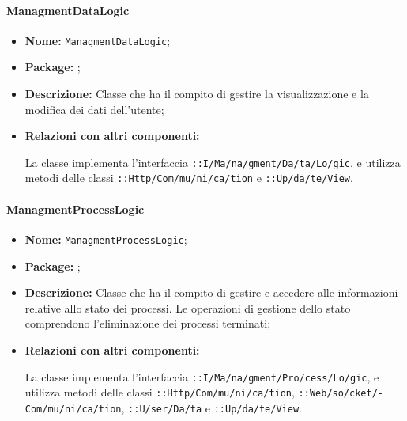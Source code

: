 \paragraph{ManagmentDataLogic}
\begin{flushleft}
\begin{itemize}
\item \textbf{Nome:} \texttt{ManagmentDataLogic};
\item \textbf{Package:} \texttt{\logicUser{}};
\item \textbf{Descrizione:} Classe che ha il compito di gestire la visualizzazione e la modifica dei dati dell'utente;
\item \textbf{Relazioni con altri componenti:}
\begin{sloppypar}
La classe implementa l'interfaccia \texttt{\iLogicUser{}::I\fshyp{}Ma\fshyp{}na\fshyp{}gment\fshyp{}Da\fshyp{}ta\fshyp{}Lo\fshyp{}gic}, e utilizza metodi delle classi \texttt{\serverCommunication{}::Http\fshyp{}Com\fshyp{}mu\fshyp{}ni\fshyp{}ca\fshyp{}tion} e \texttt{\viewUser{}::Up\fshyp{}da\fshyp{}te\fshyp{}View}.
\end{sloppypar}
\end{itemize}
\end{flushleft}

\paragraph{ManagmentProcessLogic}
\begin{flushleft}
\begin{itemize}
\item \textbf{Nome:} \texttt{ManagmentProcessLogic};
\item \textbf{Package:} \texttt{\logicUser{}};
\item \textbf{Descrizione:} Classe che ha il compito di gestire e accedere alle informazioni relative allo stato dei processi. Le operazioni di gestione dello stato comprendono l'eliminazione dei processi terminati;
\item \textbf{Relazioni con altri componenti:}
\begin{sloppypar}
La classe implementa l'interfaccia \texttt{\iLogicUser{}::I\fshyp{}Ma\fshyp{}na\fshyp{}gment\fshyp{}Pro\fshyp{}cess\fshyp{}Lo\fshyp{}gic}, e utilizza metodi delle classi 
\texttt{\serverCommunication{}::Http\fshyp{}Com\fshyp{}mu\fshyp{}ni\fshyp{}ca\fshyp{}tion}, 
\texttt{\serverCommunication{}::Web\fshyp{}so\fshyp{}cket\fshyp{}Com\fshyp{}mu\fshyp{}ni\fshyp{}ca\fshyp{}tion}, \texttt{\modelUser{}::U\fshyp{}ser\fshyp{}Da\fshyp{}ta} e 
\texttt{\viewUser{}::Up\fshyp{}da\fshyp{}te\fshyp{}View}.
\end{sloppypar}
\end{itemize}
\end{flushleft}

